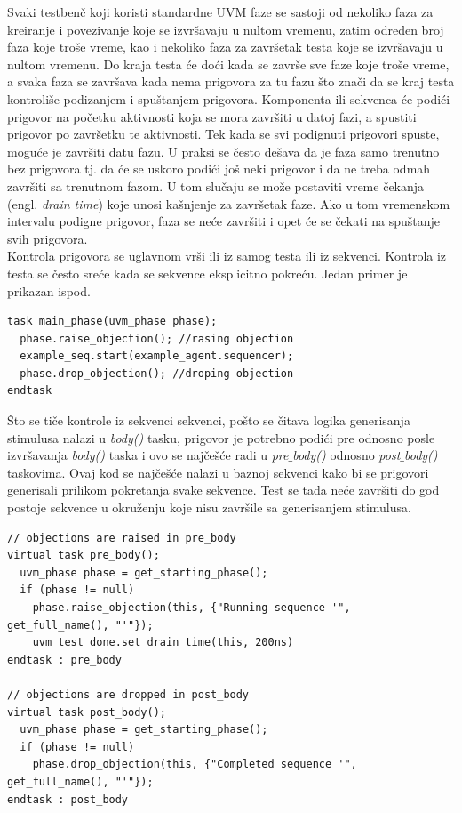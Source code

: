 Svaki testbenč koji koristi standardne UVM faze se sastoji od nekoliko faza za
kreiranje i povezivanje koje se izvršavaju u nultom vremenu, zatim određen broj
faza koje troše vreme, kao i nekoliko faza za završetak testa koje se izvršavaju
u nultom vremenu. Do kraja testa će doći kada se završe sve faze koje troše
vreme, a svaka faza se završava kada nema prigovora za tu fazu što znači da se
kraj testa kontroliše podizanjem i spuštanjem prigovora. Komponenta ili sekvenca
će podići prigovor na početku aktivnosti koja se mora završiti u datoj fazi, a
spustiti prigovor po završetku te aktivnosti. Tek kada se svi podignuti
prigovori spuste, moguće je završiti datu fazu. U praksi se često dešava da je
faza samo trenutno bez prigovora tj. da će se uskoro podići još neki prigovor i
da ne treba odmah završiti sa trenutnom fazom. U tom slučaju se može postaviti
vreme čekanja (engl. \emph{drain time}) koje unosi kašnjenje za završetak faze.
Ako u tom vremenskom intervalu podigne prigovor, faza se neće završiti i opet će
se čekati na spuštanje svih prigovora.\\

Kontrola prigovora se uglavnom vrši ili iz samog testa ili iz sekvenci.
Kontrola iz testa se često sreće kada se sekvence eksplicitno pokreću.
Jedan primer je prikazan ispod.

\begin{lstlisting}
task main_phase(uvm_phase phase);
  phase.raise_objection(); //rasing objection
  example_seq.start(example_agent.sequencer);
  phase.drop_objection(); //droping objection
endtask
\end{lstlisting}

Što se tiče kontrole iz sekvenci sekvenci, pošto se čitava logika generisanja
stimulusa nalazi u \emph{body()} tasku, prigovor je potrebno podići pre odnosno
posle izvršavanja \emph{body()} taska i ovo se najčešće radi u
\emph{pre\(\_\)body()} odnosno \emph{post\(\_\)body()} taskovima.
Ovaj kod se najčešće nalazi u baznoj sekvenci kako bi se prigovori generisali
prilikom pokretanja svake sekvence.
Test se tada neće završiti do god postoje sekvence u okruženju koje nisu
završile sa generisanjem stimulusa.

\begin{lstlisting}
// objections are raised in pre_body
virtual task pre_body();
  uvm_phase phase = get_starting_phase();
  if (phase != null)
    phase.raise_objection(this, {"Running sequence '", get_full_name(), "'"});
    uvm_test_done.set_drain_time(this, 200ns)
endtask : pre_body

// objections are dropped in post_body
virtual task post_body();
  uvm_phase phase = get_starting_phase();
  if (phase != null)
    phase.drop_objection(this, {"Completed sequence '", get_full_name(), "'"});
endtask : post_body
\end{lstlisting}

